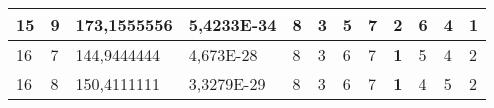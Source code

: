 \documentclass[conference]{IEEEtran}
\begin{document}
\begin{table*}[]
\begin{tabular}{|llll|llllllll|}
\multicolumn{1}{|l|}{15}                                                             & \multicolumn{1}{l|}{9}                                                                 & \multicolumn{1}{l|}{173,1555556}                                                           & 5,4233E-34                              & \multicolumn{1}{l|}{8}                                                           & \multicolumn{1}{l|}{3}                                                           & \multicolumn{1}{l|}{5}                                                           & \multicolumn{1}{l|}{7}                                                           & \multicolumn{1}{l|}{2}                                                           & \multicolumn{1}{l|}{6}                                                           & \multicolumn{1}{l|}{4}                                                           & \textbf{1}                          \\ \hline
\multicolumn{1}{|l|}{16}                                                             & \multicolumn{1}{l|}{7}                                                                 & \multicolumn{1}{l|}{144,9444444}                                                           & 4,673E-28                               & \multicolumn{1}{l|}{8}                                                           & \multicolumn{1}{l|}{3}                                                           & \multicolumn{1}{l|}{6}                                                           & \multicolumn{1}{l|}{7}                                                           & \multicolumn{1}{l|}{\textbf{1}}                                                  & \multicolumn{1}{l|}{5}                                                           & \multicolumn{1}{l|}{4}                                                           & 2                                   \\ \hline
\multicolumn{1}{|l|}{16}                                                             & \multicolumn{1}{l|}{8}                                                                 & \multicolumn{1}{l|}{150,4111111}                                                           & 3,3279E-29                              & \multicolumn{1}{l|}{8}                                                           & \multicolumn{1}{l|}{3}                                                           & \multicolumn{1}{l|}{6}                                                           & \multicolumn{1}{l|}{7}                                                           & \multicolumn{1}{l|}{\textbf{1}}                                                  & \multicolumn{1}{l|}{4}                                                           & \multicolumn{1}{l|}{5}                                                           & 2                                   \\ \hline

\end{tabular}
\end{table*}
\end{document}
